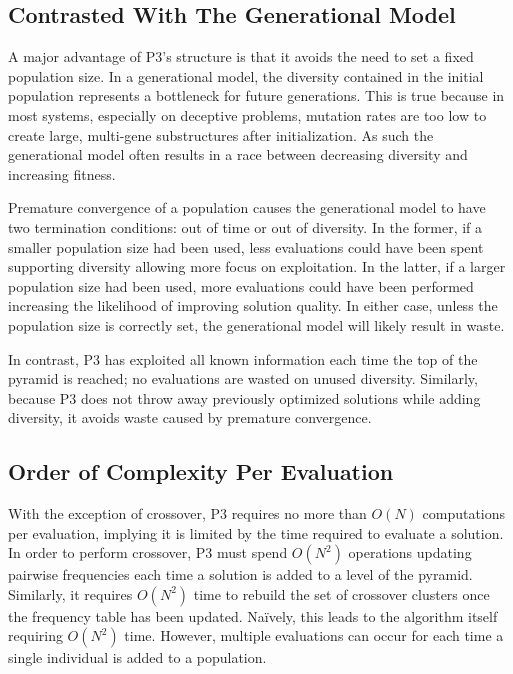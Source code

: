 \documentclass{sig-alternate}
\begin{document}
\subsection{Contrasted With The Generational Model}
A major advantage of P3's structure is that it avoids the need to set
a fixed population size.  In a generational model, the diversity
contained in the initial population represents a bottleneck for future
generations.  This is true because in most systems, especially on
deceptive problems, mutation rates are too low
to create large, multi-gene substructures after
initialization.  As such the generational model often results in a
race between decreasing diversity and increasing fitness. 

Premature convergence of a population causes the generational model
to have two termination conditions: out of time or out of
diversity.  In the former, if a smaller population size had been used,
less evaluations could have been spent supporting diversity allowing more
focus on exploitation.
In the latter, if a larger population size had been
used, more evaluations could have been performed increasing the
likelihood of improving solution quality.  In
either case, unless the population size is correctly set, the
generational model will likely result in waste.

In contrast, P3 has exploited all known information each time the top of the pyramid is reached;
no evaluations are wasted  on unused diversity.  Similarly, because P3
does not throw away previously optimized solutions while adding diversity, it avoids
waste caused by premature convergence.

\subsection{Order of Complexity Per Evaluation}
With the exception of crossover, P3 requires no more than $O(N)$ computations
per evaluation, implying it is limited by the time required to evaluate a solution.
In order to perform crossover, P3 must spend $O(N^2)$ operations updating pairwise
frequencies each time a solution is added to a level of the pyramid.  Similarly,
it requires $O(N^2)$ time to rebuild the set of crossover clusters once the frequency
table has been updated.  Na\"ively, this leads to the algorithm itself requiring $O(N^2)$ time.
However, multiple evaluations can occur for each time a single individual is added
to a population.
\end{document}
